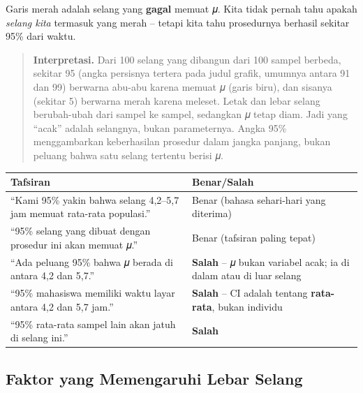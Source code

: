 \documentclass[
  indonesian,
  letterpaper,
]{book}
\newcounter{none} %
\begin{document}
Garis merah adalah selang yang \textbf{gagal} memuat 𝜇. Kita tidak
pernah tahu apakah \emph{selang kita} termasuk yang merah -- tetapi kita
tahu prosedurnya berhasil sekitar 95\% dari waktu.

\begin{quote}
\textbf{Interpretasi.} Dari 100 selang yang dibangun dari 100 sampel
berbeda, sekitar 95 (angka persisnya tertera pada judul grafik, umumnya
antara 91 dan 99) berwarna abu-abu karena memuat 𝜇 (garis biru), dan
sisanya (sekitar 5) berwarna merah karena meleset. Letak dan lebar
selang berubah-ubah dari sampel ke sampel, sedangkan 𝜇 tetap diam. Jadi
yang ``acak'' adalah selangnya, bukan parameternya. Angka 95\%
menggambarkan keberhasilan prosedur dalam jangka panjang, bukan peluang
bahwa satu selang tertentu berisi 𝜇.
\end{quote}

{\def\LTcaptype{none} %
\begin{longtable}[]{@{}
  >{\raggedright\arraybackslash}p{}
  >{\raggedright\arraybackslash}p{}@{}}
\toprule\noalign{}
\begin{minipage}[b]{\linewidth}\raggedright
Tafsiran
\end{minipage} & \begin{minipage}[b]{\linewidth}\raggedright
Benar/Salah
\end{minipage} \\
\midrule\noalign{}
\endhead
\bottomrule\noalign{}
\endlastfoot
``Kami 95\% yakin bahwa selang 4,2--5,7 jam memuat rata-rata populasi.''
& Benar (bahasa sehari-hari yang diterima) \\
``95\% selang yang dibuat dengan prosedur ini akan memuat 𝜇.'' & Benar
(tafsiran paling tepat) \\
``Ada peluang 95\% bahwa 𝜇 berada di antara 4,2 dan 5,7.'' &
\textbf{Salah} -- 𝜇 bukan variabel acak; ia di dalam atau di luar
selang \\
``95\% mahasiswa memiliki waktu layar antara 4,2 dan 5,7 jam.'' &
\textbf{Salah} -- CI adalah tentang \textbf{rata-rata}, bukan
individu \\
``95\% rata-rata sampel lain akan jatuh di selang ini.'' &
\textbf{Salah} \\
\end{longtable}
}

\subsection{Faktor yang Memengaruhi Lebar
Selang}\label{faktor-yang-memengaruhi-lebar-selang}
\end{document}
